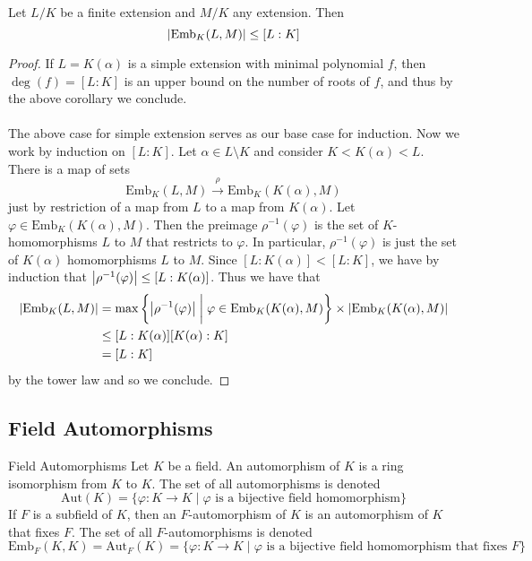 \documentclass[a4paper]{article}
\begin{document}
\begin{thm}{}{} Let $L/K$ be a finite extension and $M/K$ any extension. Then $$\abs{\text{Emb}_K(L,M)}\leq[L:K]$$ \tcbline
\begin{proof}
If $L=K(\alpha)$ is a simple extension with minimal polynomial $f$, then $\deg(f)=[L:K]$ is an upper bound on the number of roots of $f$, and thus by the above corollary we conclude. \\~\\

The above case for simple extension serves as our base case for induction. Now we work by induction on $[L:K]$. Let $\alpha\in L\setminus K$ and consider $K<K(\alpha)<L$. There is a map of sets $$\text{Emb}_K(L,M)\overset{\rho}{\to}\text{Emb}_K(K(\alpha),M)$$ just by restriction of a map from $L$ to a map from $K(\alpha)$. Let $\varphi\in\text{Emb}_K(K(\alpha),M)$. Then the preimage $\rho^{-1}(\varphi)$ is the set of $K$-homomorphisms $L$ to $M$ that restricts to $\varphi$. In particular, $\rho^{-1}(\varphi)$ is just the set of $K(\alpha)$ homomorphisms $L$ to $M$. Since $[L:K(\alpha)]<[L:K]$, we have by induction that $\abs{\rho^{-1}(\varphi)}\leq[L:K(\alpha)]$. Thus we have that 
\begin{align*}
\abs{\text{Emb}_K(L,M)}&=\max\left\{\abs{\rho^{-1}(\varphi)}\;\bigg{|}\;\varphi\in\text{Emb}_K(K(\alpha),M)\right\}\times\abs{\text{Emb}_K(K(\alpha),M)}\\
&\leq[L:K(\alpha)][K(\alpha):K]\\
&=[L:K]
\end{align*}
by the tower law and so we conclude. 
\end{proof}
\end{thm}

\subsection{Field Automorphisms}
\begin{defn}{Field Automorphisms}{} Let $K$ be a field. An automorphism of $K$ is a ring isomorphism from $K$ to $K$. The set of all automorphisms is denoted $$\text{Aut}(K)=\{\varphi:K\to K\;|\;\varphi\text{ is a bijective field homomorphism}\}$$ If $F$ is a subfield of $K$, then an $F$-automorphism of $K$ is an automorphism of $K$ that fixes $F$. The set of all $F$-automorphisms is denoted $$\text{Emb}_F(K,K)=\text{Aut}_F(K)=\{\varphi:K\to K\;|\;\varphi\text{ is a bijective field homomorphism that fixes }F\}$$
\end{defn}
\end{document}
